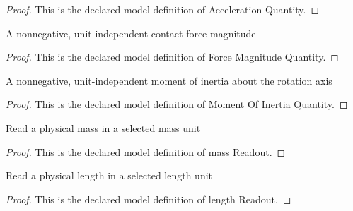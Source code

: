 \begin{proof}
  This is the declared model definition of Acceleration Quantity.
\end{proof}
\begin{definition}
  \label{def:physics:phyx-mini-0786:phyxminiproblems-problemphyxmini0786-forcemagnitudequantity}
  A nonnegative, unit-independent contact-force magnitude
\end{definition}
\begin{proof}
  This is the declared model definition of Force Magnitude Quantity.
\end{proof}
\begin{definition}
  \label{def:physics:phyx-mini-0786:phyxminiproblems-problemphyxmini0786-momentofinertiaquantity}
  A nonnegative, unit-independent moment of inertia about the rotation axis
\end{definition}
\begin{proof}
  This is the declared model definition of Moment Of Inertia Quantity.
\end{proof}
\begin{definition}
  \label{def:physics:phyx-mini-0786:phyxminiproblems-problemphyxmini0786-massreadout}
  Read a physical mass in a selected mass unit
\end{definition}
\begin{proof}
  This is the declared model definition of mass Readout.
\end{proof}
\begin{definition}
  \label{def:physics:phyx-mini-0786:phyxminiproblems-problemphyxmini0786-lengthreadout}
  Read a physical length in a selected length unit
\end{definition}
\begin{proof}
  This is the declared model definition of length Readout.
\end{proof}
